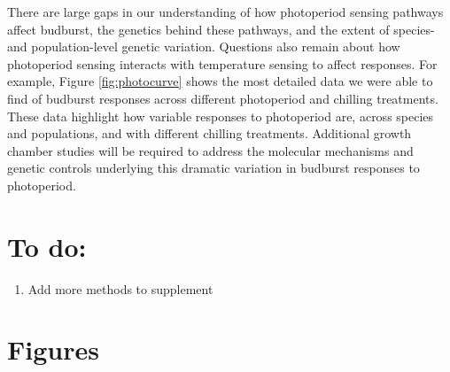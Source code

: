 \documentclass{article}
\begin{document}
\par There are large gaps in our understanding of how photoperiod sensing pathways affect budburst, the genetics behind these pathways, and the extent of species- and population-level genetic variation. Questions also remain about how photoperiod sensing interacts with temperature sensing to affect responses. For example, Figure \ref{fig:photocurve} shows the most detailed data we were able to find of budburst responses across different photoperiod and chilling treatments. These data highlight how variable responses to photoperiod are, across species and populations, and with different chilling treatments. Additional growth chamber studies will be required to address the molecular mechanisms and genetic controls underlying this dramatic variation in  budburst responses to photoperiod. 

\section* {To do:}
\begin{enumerate}
\item Add more methods to supplement
\end{enumerate}


\clearpage


\section* {Figures}
\end{document}
